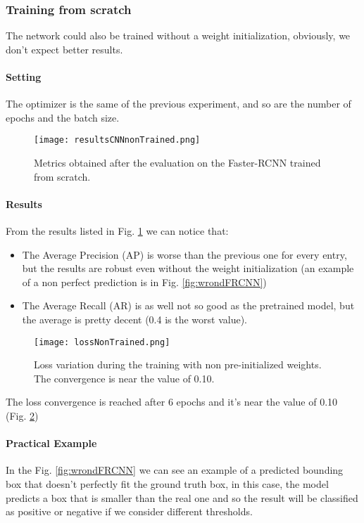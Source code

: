 \subsubsection{Training from scratch}
The network could also be trained without a weight initialization, obviously, we don't expect better results.

\paragraph{Setting}
The optimizer is the same of the previous experiment, and so are the number of epochs and the batch size.

\begin{figure}[h!]
  \centering
  \texttt{[image: resultsCNNnonTrained.png]}
  \caption{Metrics obtained after the evaluation on the Faster-RCNN trained from scratch.}
  \label{fig:resultsCNNNonTrained}
\end{figure}

\paragraph{Results}
From the results listed in Fig. \ref{fig:resultsCNNNonTrained} we can notice that:
\begin{itemize}
    \item The Average Precision (AP) is worse than the previous one for every entry, but the results are robust even without the weight initialization (an example of a non perfect prediction is in Fig. \ref{fig:wrondFRCNN})
    \item The Average Recall (AR) is as well not so good as the pretrained model, but the average is pretty decent (0.4 is the worst value).
\end{itemize}

\begin{figure}[h!]
  \centering
  \texttt{[image: lossNonTrained.png]}
  \caption{Loss variation during the training with non pre-initialized weights. The convergence is near the value of 0.10.}
  \label{fig:lossnontrainedcnn}
\end{figure}

The loss convergence is reached after 6 epochs and it's near the value of 0.10 (Fig. \ref{fig:lossnontrainedcnn})

\paragraph{Practical Example}
In the Fig. \ref{fig:wrondFRCNN} we can see an example of a predicted bounding box that doesn't perfectly fit the ground truth box, in this case, the model predicts a box that is smaller than the real one and so the result will be classified as positive or negative if we consider different thresholds.

